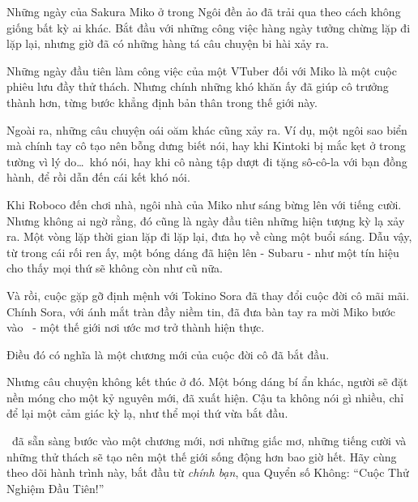 \documentclass[main.tex]{subfiles}
\begin{document}
\color{black}

Những ngày của Sakura Miko ở trong Ngôi đền ảo đã trải qua theo cách không giống bất kỳ ai khác. Bắt đầu với những công việc hàng ngày tưởng chừng lặp đi lặp lại, nhưng giờ đã có những hàng tá câu chuyện bi hài xảy ra.

Những ngày đầu tiên làm công việc của một VTuber đối với Miko là một cuộc phiêu lưu đầy thử thách. Nhưng chính những khó khăn ấy đã giúp cô trưởng thành hơn, từng bước khẳng định bản thân trong thế giới này.

Ngoài ra, những câu chuyện oái oăm khác cũng xảy ra. Ví dụ, một ngôi sao biển mà chính tay cô tạo nên bỗng dưng biết nói, hay khi Kintoki bị mắc kẹt ở trong tường vì lý do\dots\ khó nói, hay khi cô nàng tập dượt đi tặng sô-cô-la với bạn đồng hành, để rồi dẫn đến cái kết khó nói.

Khi Roboco đến chơi nhà, ngôi nhà của Miko như sáng bừng lên với tiếng cười. Nhưng không ai ngờ rằng, đó cũng là ngày đầu tiên những hiện tượng kỳ lạ xảy ra. Một vòng lặp thời gian lặp đi lặp lại, đưa họ về cùng một buổi sáng. Dẫu vậy, từ trong cái rối ren ấy, một bóng dáng đã hiện lên - Subaru - như một tín hiệu cho thấy mọi thứ sẽ không còn như cũ nữa.

Và rồi, cuộc gặp gỡ định mệnh với Tokino Sora đã thay đổi cuộc đời cô mãi mãi. Chính Sora, với ánh mắt tràn đầy niềm tin, đã đưa bàn tay ra mời Miko bước vào \hll\ - một thế giới nơi ước mơ trở thành hiện thực.

Điều đó có nghĩa là một chương mới của cuộc đời cô đã bắt đầu.

Nhưng câu chuyện không kết thúc ở đó. Một bóng dáng bí ẩn khác, người sẽ đặt nền móng cho một kỷ nguyên mới, đã xuất hiện. Cậu ta không nói gì nhiều, chỉ để lại một cảm giác kỳ lạ, như thể mọi thứ vừa bắt đầu.

\hll\ đã sẵn sàng bước vào một chương mới, nơi những giấc mơ, những tiếng cười và những thử thách sẽ tạo nên một thế giới sống động hơn bao giờ hết. Hãy cùng theo dõi hành trình này, bắt đầu từ \emph{chính bạn}, qua Quyển số Không: ``Cuộc Thử Nghiệm Đầu Tiên!''
\end{document}

